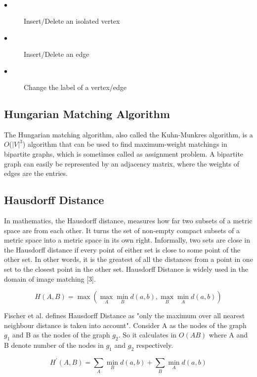 \documentclass{article}
\begin{document}
\begin{description}
  \item[$\bullet$] Insert/Delete an isolated vertex
  \item[$\bullet$] Insert/Delete an edge
  \item[$\bullet$] Change the label of a vertex/edge\\
\end{description}


 \subsection{Hungarian Matching Algorithm}
 The Hungarian matching algorithm, also called the Kuhn-Munkres algorithm, is a $O$($|V|^3$) algorithm that can be used to find maximum-weight matchings in bipartite graphs, which is sometimes called as assignment problem. A bipartite graph can easily be represented by an adjacency matrix, where the weights of edges are the entries. 
 
 \subsection{Hausdorff Distance}
 In mathematics, the Hausdorff distance, measures how far two subsets of a metric space are from each other. It turns the set of non-empty compact subsets of a metric space into a metric space in its own right. Informally, two sets are close in the Hausdorff distance if every point of either set is close to some point of the other set. In other words, it is the greatest of all the distances from a point in one set to the closest point in the other set. Hausdorff Distance is widely used in the domain of image matching [3].



\begin{equation}
H(A, B)=\max \left(\max _{A} \min _{B} d(a, b), \max _{B} \min _{A} d(a, b)\right)
\end{equation}


Fischer et al. defines Hausdorff Distance as "only the maximum over all nearest neighbour distance is taken into account". Consider A as the nodes of the graph $g_1$ and B as the nodes of the graph $g_2$. So it calculates in $O(AB)$ where A and B denote number of the nodes in $g_1$ and $g_2$ respectively.

\begin{equation}
H^{\prime}(A, B)=\sum_{A} \min _{B} d(a, b)+\sum_{B} \min _{A} d(a, b)
\end{equation}
\end{document}
